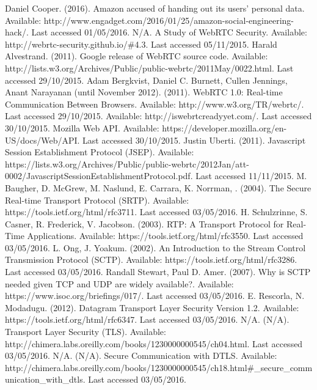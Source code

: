 \documentclass[]{report}
\begin{document}
\begin{thebibliography}{20}
		Daniel Cooper. (2016). Amazon accused of handing out its users' personal data. Available: http://www.engadget.com/2016/01/25/amazon-social-engineering-hack/. Last accessed 01/05/2016.
		N/A. A Study of WebRTC Security. Available: http://webrtc-security.github.io/\#4.3. Last accessed 05/11/2015.
		Harald Alvestrand. (2011). Google release of WebRTC source code. Available: http://lists.w3.org/Archives/Public/public-webrtc/2011May/0022.html. Last accessed 29/10/2015.
		Adam Bergkvist, Daniel C. Burnett, Cullen Jennings, Anant Narayanan (until November 2012). (2011). WebRTC 1.0: Real-time Communication Between Browsers. Available: http://www.w3.org/TR/webrtc/. Last accessed 29/10/2015.
		Available: http://iswebrtcreadyyet.com/. Last accessed 30/10/2015.
		Mozilla Web API. Available: https://developer.mozilla.org/en-US/docs/Web/API. Last accessed 30/10/2015.
		Justin Uberti. (2011). Javascript Session Establishment Protocol (JSEP). Available: https://lists.w3.org/Archives/Public/public-webrtc/2012Jan/att-0002/JavascriptSessionEstablishmentProtocol.pdf. Last accessed 11/11/2015.
		M. Baugher, D. McGrew, M. Naslund, E. Carrara, K. Norrman, . (2004). The Secure Real-time Transport Protocol (SRTP). Available: https://tools.ietf.org/html/rfc3711. Last accessed 03/05/2016.
		H. Schulzrinne, S. Casner, R. Frederick, V. Jacobson. (2003). RTP: A Transport Protocol for Real-Time Applications. Available: https://tools.ietf.org/html/rfc3550. Last accessed 03/05/2016.
		L. Ong, J. Yoakum. (2002). An Introduction to the Stream Control Transmission Protocol (SCTP). Available: https://tools.ietf.org/html/rfc3286. Last accessed 03/05/2016.
		Randall Stewart, Paul D. Amer. (2007). Why is SCTP needed given TCP and UDP are widely available?. Available: https://www.isoc.org/briefings/017/. Last accessed 03/05/2016.
		E. Rescorla, N. Modadugu. (2012). Datagram Transport Layer Security Version 1.2. Available: https://tools.ietf.org/html/rfc6347. Last accessed 03/05/2016.
		N/A. (N/A). Transport Layer Security (TLS). Available: http://chimera.labs.oreilly.com/books/1230000000545/ch04.html. Last accessed 03/05/2016.
		N/A. (N/A). Secure Communication with DTLS. Available: http://chimera.labs.oreilly.com/books/1230000000545/ch18.html#_secure_communication_with_dtls. Last accessed 03/05/2016.

\end{thebibliography}
\end{document}
